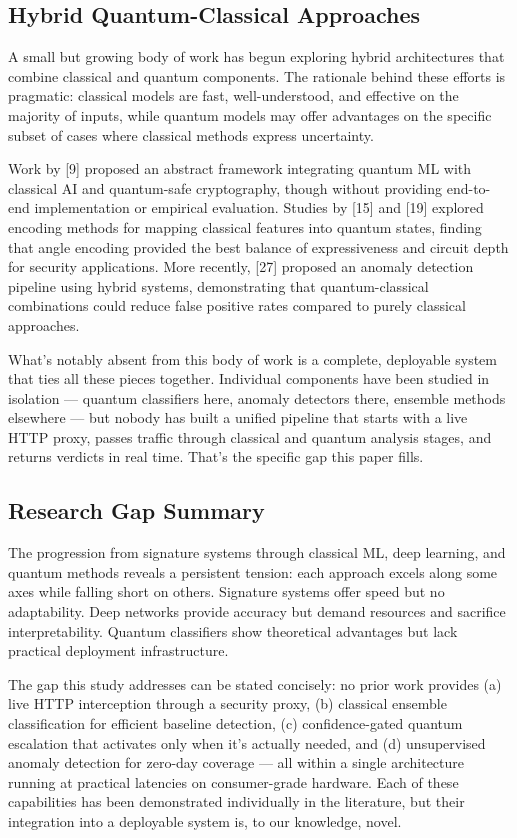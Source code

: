\documentclass[journal,onecolumn]{IEEEtran}
\begin{document}
\subsection{Hybrid Quantum-Classical Approaches}

A small but growing body of work has begun exploring hybrid architectures that combine classical and quantum components. The rationale behind these efforts is pragmatic: classical models are fast, well-understood, and effective on the majority of inputs, while quantum models may offer advantages on the specific subset of cases where classical methods express uncertainty.

Work by [9] proposed an abstract framework integrating quantum ML with classical AI and quantum-safe cryptography, though without providing end-to-end implementation or empirical evaluation. Studies by [15] and [19] explored encoding methods for mapping classical features into quantum states, finding that angle encoding provided the best balance of expressiveness and circuit depth for security applications. More recently, [27] proposed an anomaly detection pipeline using hybrid systems, demonstrating that quantum-classical combinations could reduce false positive rates compared to purely classical approaches.

What's notably absent from this body of work is a complete, deployable system that ties all these pieces together. Individual components have been studied in isolation --- quantum classifiers here, anomaly detectors there, ensemble methods elsewhere --- but nobody has built a unified pipeline that starts with a live HTTP proxy, passes traffic through classical and quantum analysis stages, and returns verdicts in real time. That's the specific gap this paper fills.

\subsection{Research Gap Summary}

The progression from signature systems through classical ML, deep learning, and quantum methods reveals a persistent tension: each approach excels along some axes while falling short on others. Signature systems offer speed but no adaptability. Deep networks provide accuracy but demand resources and sacrifice interpretability. Quantum classifiers show theoretical advantages but lack practical deployment infrastructure.

The gap this study addresses can be stated concisely: no prior work provides (a) live HTTP interception through a security proxy, (b) classical ensemble classification for efficient baseline detection, (c) confidence-gated quantum escalation that activates only when it's actually needed, and (d) unsupervised anomaly detection for zero-day coverage --- all within a single architecture running at practical latencies on consumer-grade hardware. Each of these capabilities has been demonstrated individually in the literature, but their integration into a deployable system is, to our knowledge, novel.
\end{document}
